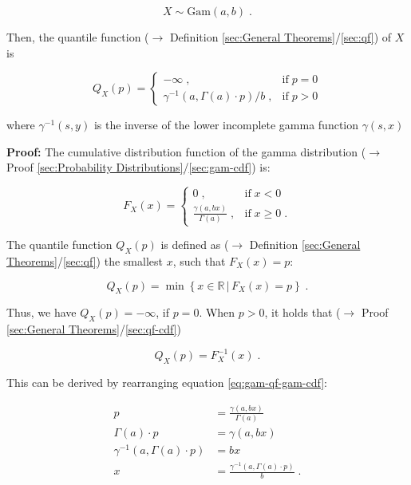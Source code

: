 \documentclass[a4paper,12pt,twoside]{book}
\begin{document}
\begin{equation} \label{eq:gam-qf-gam}
X \sim \mathrm{Gam}(a,b) \; .
\end{equation}

Then, the quantile function ($\rightarrow$ Definition \ref{sec:General Theorems}/\ref{sec:qf}) of $X$ is

\begin{equation} \label{eq:gam-qf-gam-qf}
Q_X(p) = \left\{
\begin{array}{rl}
-\infty \; , & \text{if} \; p = 0 \\
\gamma^{-1}(a, \Gamma(a) \cdot p)/b \; , & \text{if} \; p > 0
\end{array}
\right.
\end{equation}

where $\gamma^{-1}(s, y)$ is the inverse of the lower incomplete gamma function $\gamma(s, x)$


\vspace{1em}
\textbf{Proof:} The cumulative distribution function of the gamma distribution ($\rightarrow$ Proof \ref{sec:Probability Distributions}/\ref{sec:gam-cdf}) is:

\begin{equation} \label{eq:gam-qf-gam-cdf}
F_X(x) = \left\{
\begin{array}{rl}
0 \; , & \text{if} \; x < 0 \\
\frac{\gamma(a,bx)}{\Gamma(a)} \; , & \text{if} \; x \geq 0 \; .
\end{array}
\right.
\end{equation}

The quantile function $Q_X(p)$ is defined as ($\rightarrow$ Definition \ref{sec:General Theorems}/\ref{sec:qf}) the smallest $x$, such that $F_X(x) = p$:

\begin{equation} \label{eq:gam-qf-qf}
Q_X(p) = \min \left\lbrace x \in \mathbb{R} \, \vert \, F_X(x) = p \right\rbrace \; .
\end{equation}

Thus, we have $Q_X(p) = -\infty$, if $p = 0$. When $p > 0$, it holds that ($\rightarrow$ Proof \ref{sec:General Theorems}/\ref{sec:qf-cdf})

\begin{equation} \label{eq:gam-qf-gam-qf-s1}
Q_X(p) = F_X^{-1}(x) \; .
\end{equation}

This can be derived by rearranging equation \eqref{eq:gam-qf-gam-cdf}:

\begin{equation} \label{eq:gam-qf-gam-qf-s2}
\begin{split}
p &= \frac{\gamma(a,bx)}{\Gamma(a)} \\
\Gamma(a) \cdot p &= \gamma(a,bx) \\
\gamma^{-1}(a, \Gamma(a) \cdot p) &= bx \\
x &= \frac{\gamma^{-1}(a, \Gamma(a) \cdot p)}{b} \; .
\end{split}
\end{equation}
\end{document}
